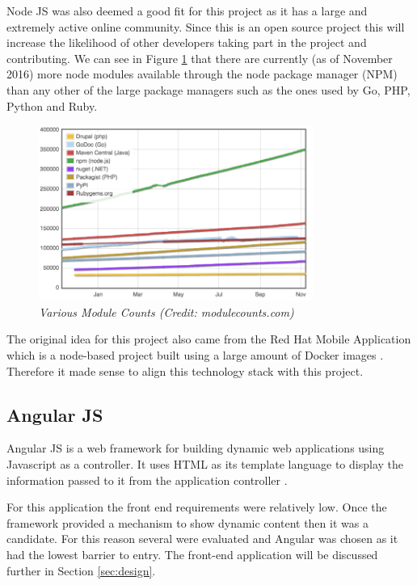Node JS was also deemed a good fit for this project as it has a large and extremely active online community. Since this is an open source project this will increase the likelihood of other developers taking part in the project and contributing. We can see in Figure \ref{fig:counts} that there are currently (as of November 2016) more node modules available through the node package manager (NPM) than any other of the large package managers such as the ones used by Go, PHP, Python and Ruby. 
\newpage
\begin{figure}[!ht]
\centering
\includegraphics*[width=0.8\textwidth]{images/module_counts}
\caption{\em Various Module Counts (Credit: modulecounts.com)}
\label{fig:counts}
\end{figure}

The original idea for this project also came from the Red Hat Mobile Application which is a node-based project built using a large amount of Docker images \citep{RedHat2016}. Therefore it made sense to align this technology stack with this project.

\subsection{Angular JS}
Angular JS is a web framework for building dynamic web applications using Javascript as a controller. It uses HTML as its template language to display the information passed to it from the application controller \citep{Angular2017}. 

For this application the front end requirements were relatively low. Once the framework provided a mechanism to show dynamic content then it was a candidate. For this reason several were evaluated and Angular was chosen as it had the lowest barrier to entry. The front-end application will be discussed further in Section \ref{sec:design}.


